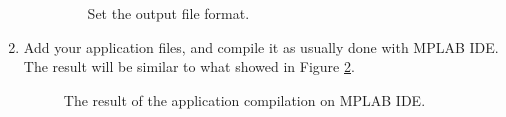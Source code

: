 \begin{enumerate}
\begin{enumerate}
\begin{figure}[htb]
\caption{Set the output file format.}
\label{fig:mplab-support6}
\end{figure}

  \end{enumerate}




\item
  Add your application files, and compile it as usually done with MPLAB IDE. The result will be similar to what showed in Figure \ref{fig:mplab-support7}.

%
\begin{figure}[htb]
\caption{The result of the application compilation on MPLAB IDE.}
\label{fig:mplab-support7}
\end{figure}

\end{enumerate}


